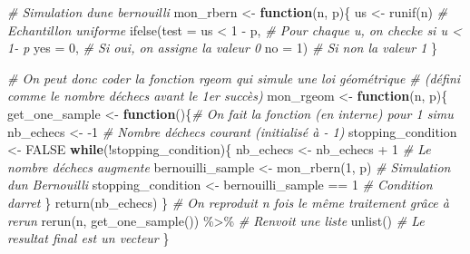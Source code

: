 \documentclass[
]{article}
\newenvironment{Shaded}{\begin{snugshade}}{\end{snugshade}}
\newcommand{\AttributeTok}[1]{\textcolor[rgb]{0.77,0.63,0.00}{#1}}
\newcommand{\CommentTok}[1]{\textcolor[rgb]{0.56,0.35,0.01}{\textit{#1}}}
\newcommand{\ConstantTok}[1]{\textcolor[rgb]{0.00,0.00,0.00}{#1}}
\newcommand{\ControlFlowTok}[1]{\textcolor[rgb]{0.13,0.29,0.53}{\textbf{#1}}}
\newcommand{\DecValTok}[1]{\textcolor[rgb]{0.00,0.00,0.81}{#1}}
\newcommand{\FunctionTok}[1]{\textcolor[rgb]{0.00,0.00,0.00}{#1}}
\newcommand{\NormalTok}[1]{#1}
\newcommand{\OtherTok}[1]{\textcolor[rgb]{0.56,0.35,0.01}{#1}}
\newcommand{\SpecialCharTok}[1]{\textcolor[rgb]{0.00,0.00,0.00}{#1}}
\begin{document}
\begin{Shaded}
\begin{Highlighting}[]
\CommentTok{\# Simulation d\textquotesingle{}une bernouilli}
\NormalTok{mon\_rbern }\OtherTok{\textless{}{-}} \ControlFlowTok{function}\NormalTok{(n, p)\{}
\NormalTok{  us }\OtherTok{\textless{}{-}} \FunctionTok{runif}\NormalTok{(n) }\CommentTok{\# Echantillon uniforme}
  \FunctionTok{ifelse}\NormalTok{(}\AttributeTok{test =}\NormalTok{ us }\SpecialCharTok{\textless{}} \DecValTok{1} \SpecialCharTok{{-}}\NormalTok{ p, }\CommentTok{\# Pour chaque u, on checke si u \textless{} 1{-} p}
         \AttributeTok{yes =} \DecValTok{0}\NormalTok{, }\CommentTok{\# Si oui, on assigne la valeur 0}
         \AttributeTok{no =} \DecValTok{1}\NormalTok{)  }\CommentTok{\# Si non la valeur 1}
\NormalTok{\}}
\end{Highlighting}
\end{Shaded}

\begin{Shaded}
\begin{Highlighting}[]
\CommentTok{\# On peut donc coder la fonction rgeom qui simule une loi géométrique}
\CommentTok{\# (défini comme le nombre d\textquotesingle{}échecs avant le 1er succès)}
\NormalTok{mon\_rgeom }\OtherTok{\textless{}{-}} \ControlFlowTok{function}\NormalTok{(n, p)\{}
\NormalTok{  get\_one\_sample }\OtherTok{\textless{}{-}} \ControlFlowTok{function}\NormalTok{()\{}\CommentTok{\# On fait la fonction (en interne) pour 1 simu}
\NormalTok{    nb\_echecs }\OtherTok{\textless{}{-}} \SpecialCharTok{{-}}\DecValTok{1} \CommentTok{\# Nombre d\textquotesingle{}échecs courant (initialisé à {-} 1)}
\NormalTok{    stopping\_condition }\OtherTok{\textless{}{-}} \ConstantTok{FALSE}
    \ControlFlowTok{while}\NormalTok{(}\SpecialCharTok{!}\NormalTok{stopping\_condition)\{}
\NormalTok{      nb\_echecs }\OtherTok{\textless{}{-}}\NormalTok{ nb\_echecs }\SpecialCharTok{+} \DecValTok{1} \CommentTok{\# Le nombre d\textquotesingle{}échecs augmente}
\NormalTok{      bernouilli\_sample }\OtherTok{\textless{}{-}}  \FunctionTok{mon\_rbern}\NormalTok{(}\DecValTok{1}\NormalTok{, p) }\CommentTok{\# Simulation d\textquotesingle{}un Bernouilli}
\NormalTok{      stopping\_condition }\OtherTok{\textless{}{-}}\NormalTok{ bernouilli\_sample }\SpecialCharTok{==} \DecValTok{1} \CommentTok{\# Condition d\textquotesingle{}arret}
\NormalTok{    \}}
    \FunctionTok{return}\NormalTok{(nb\_echecs)}
\NormalTok{  \} }
  \CommentTok{\# On reproduit n fois le même traitement grâce à rerun}
  \FunctionTok{rerun}\NormalTok{(n, }
        \FunctionTok{get\_one\_sample}\NormalTok{()) }\SpecialCharTok{\%\textgreater{}\%} \CommentTok{\# Renvoit une liste}
    \FunctionTok{unlist}\NormalTok{()  }\CommentTok{\# Le resultat final est un vecteur}
\NormalTok{\}}
\end{Highlighting}
\end{Shaded}
\end{document}

